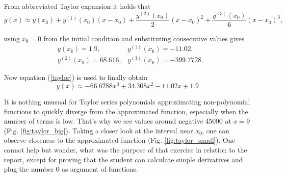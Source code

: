 \documentclass[a4paper,12pt]{article}
\begin{document}
From abbreviated Taylor expansion it holds that
\begin{equation}
    \label{taylor}
    y(x) \approx y(x_0) + y^{(1)}(x_0)(x-x_0) + \frac{y^{(2)}(x_0)}{2}(x-x_0)^2 + \frac{y^{(3)}(x_0)}{6}(x-x_0)^3,
\end{equation}

using $x_0 = 0$ from the initial condition and substituting consecutive values gives
\begin{align*}
    &y(x_0) = 1.9,
    &y^{(1)}(x_0) = -11.02, \\
    &y^{(2)}(x_0) = 68.616,
    &y^{(3)}(x_0) = -399.7728.
\end{align*}

Now equation (\ref{taylor}) is used to finally obtain
\begin{equation}
    y(x) \approx -66.6288x^3 + 34.308x^2 - 11.02x + 1.9
\end{equation}

It is nothing unusual for Taylor series polynomials approximating non-polynomial functions to quickly diverge from the approximated function, especially when the number of terms is low. That's why we see values around negative 45000 at $x = 9$ (Fig. \ref{fig:taylor_big}). Taking a closer look at the interval near $x_0$, one can observe closeness to the approximated function (Fig. \ref{fig:taylor_small}). One cannot help but wonder, what was the purpose of that exercise in relation to the report, except for proving that the student can calculate simple derivatives and plug the number 0 as argument of functions.
\end{document}
